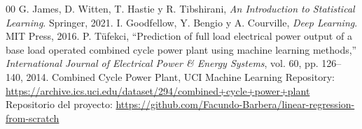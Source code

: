 \documentclass[conference]{IEEEtran}
\begin{document}
\begin{thebibliography}{00}
 G. James, D. Witten, T. Hastie y R. Tibshirani, \textit{An Introduction to Statistical Learning}. Springer, 2021.
 I. Goodfellow, Y. Bengio y A. Courville, \textit{Deep Learning}. MIT Press, 2016.
 P. Tüfekci, ``Prediction of full load electrical power output of a base load operated combined cycle power plant using machine learning methods,'' \textit{International Journal of Electrical Power \& Energy Systems}, vol. 60, pp. 126--140, 2014.
 Combined Cycle Power Plant, UCI Machine Learning Repository: \url{https://archive.ics.uci.edu/dataset/294/combined+cycle+power+plant}
 Repositorio del proyecto: \url{https://github.com/Facundo-Barbera/linear-regression-from-scratch}
\end{thebibliography}
\end{document}
